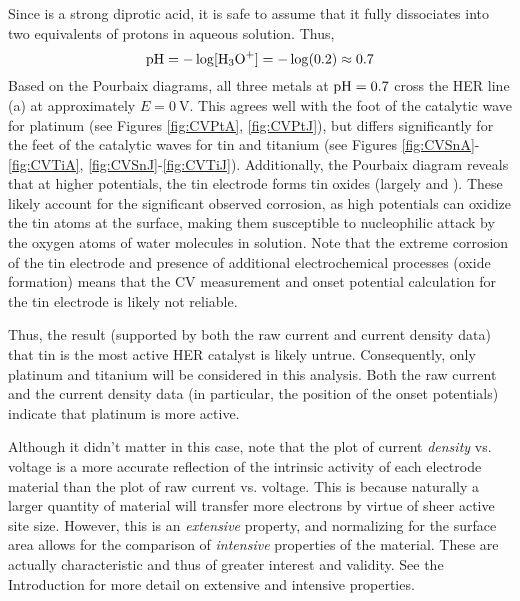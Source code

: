 \documentclass[../labs.tex]{subfiles}
\begin{document}


Since  is a strong diprotic acid, it is safe to assume that it fully dissociates into two equivalents of protons in aqueous solution. Thus,
\begin{equation}
    \pH = -\log[\ce{H3O+}]
    = -\log(0.2)
    \approx 0.7
\end{equation}
Based on the Pourbaix diagrams, all three metals at $\operatorname{pH}=0.7$ cross the HER line (a) at approximately $E=\SI{0}{\volt}$. This agrees well with the foot of the catalytic wave for platinum (see Figures \ref{fig:CVPtA}, \ref{fig:CVPtJ}), but differs significantly for the feet of the catalytic waves for tin and titanium (see Figures \ref{fig:CVSnA}-\ref{fig:CVTiA}, \ref{fig:CVSnJ}-\ref{fig:CVTiJ}). Additionally, the Pourbaix diagram reveals that at higher potentials, the tin electrode forms tin oxides (largely  and ).\supercite{bib:Pourbaix} These likely account for the significant observed corrosion, as high potentials can oxidize the tin atoms at the surface, making them susceptible to nucleophilic attack by the oxygen atoms of water molecules in solution. Note that the extreme corrosion of the tin electrode and presence of additional electrochemical processes (oxide formation) means that the CV measurement and onset potential calculation for the tin electrode is likely not reliable.\par
Thus, the result (supported by both the raw current and current density data) that tin is the most active HER catalyst is likely untrue. Consequently, only platinum and titanium will be considered in this analysis. Both the raw current and the current density data (in particular, the position of the onset potentials) indicate that platinum is more active.\par
Although it didn't matter in this case, note that the plot of current \emph{density} vs. voltage is a more accurate reflection of the intrinsic activity of each electrode material than the plot of raw current vs. voltage. This is because naturally a larger quantity of material will transfer more electrons by virtue of sheer active site size. However, this is an \emph{extensive} property, and normalizing for the surface area allows for the comparison of \emph{intensive} properties of the material. These are actually characteristic and thus of greater interest and validity. See the Introduction for more detail on extensive and intensive properties.\par
\end{document}

